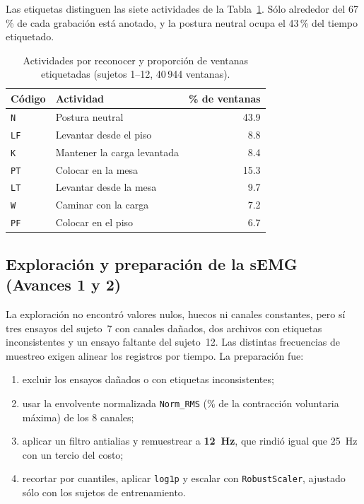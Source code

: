 \documentclass[letterpaper,11pt]{article}
\newcommand{\act}[1]{\texttt{#1}}
\begin{document}
Las etiquetas distinguen las siete actividades de la Tabla~\ref{tab:clases}. Sólo alrededor del 67\,\% de cada grabación está anotado, y la postura neutral ocupa el 43\,\% del tiempo etiquetado.

\begin{table}[H]
  \centering
  \small
  \caption{Actividades por reconocer y proporción de ventanas etiquetadas (sujetos 1--12, 40\,944 ventanas).}
  \label{tab:clases}
  \begin{tabular}{llr}
    \toprule
    Código & Actividad & \% de ventanas \\
    \midrule
    \act{N}  & Postura neutral              & 43.9 \\
    \act{LF} & Levantar desde el piso       & 8.8 \\
    \act{K}  & Mantener la carga levantada  & 8.4 \\
    \act{PT} & Colocar en la mesa           & 15.3 \\
    \act{LT} & Levantar desde la mesa       & 9.7 \\
    \act{W}  & Caminar con la carga         & 7.2 \\
    \act{PF} & Colocar en el piso           & 6.7 \\
    \bottomrule
  \end{tabular}
\end{table}

\subsection{Exploración y preparación de la sEMG (Avances 1 y 2)}
La exploración no encontró valores nulos, huecos ni canales constantes, pero sí tres ensayos del sujeto~7 con canales dañados, dos archivos con etiquetas inconsistentes y un ensayo faltante del sujeto~12. Las distintas frecuencias de muestreo exigen alinear los registros por tiempo. La preparación fue:

\begin{enumerate}
  \item excluir los ensayos dañados o con etiquetas inconsistentes;
  \item usar la envolvente normalizada \texttt{Norm\_RMS} (\% de la contracción voluntaria máxima) de los 8 canales;
  \item aplicar un filtro antialias y remuestrear a \textbf{12~Hz}, que rindió igual que 25~Hz con un tercio del costo;
  \item recortar por cuantiles, aplicar \texttt{log1p} y escalar con \texttt{RobustScaler}, ajustado sólo con los sujetos de entrenamiento.
\end{enumerate}
\end{document}

